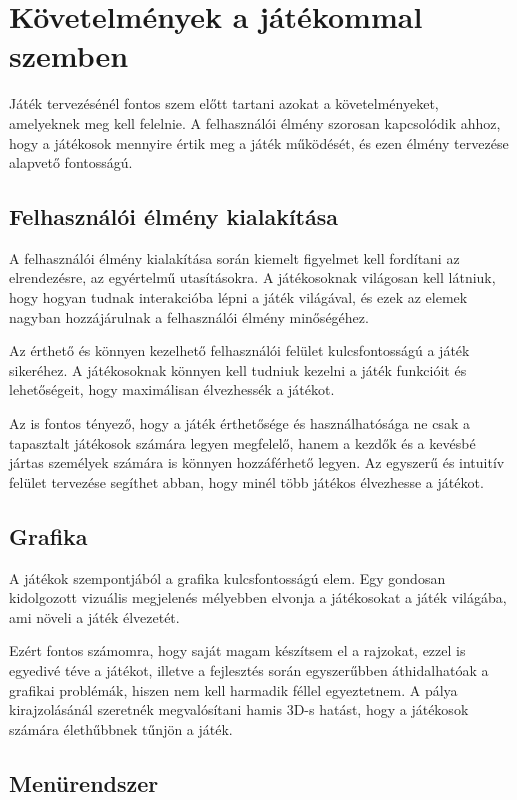 \chapter{Követelmények a játékommal szemben}
\indent \indent Játék tervezésénél fontos szem előtt tartani azokat a követelményeket, amelyeknek meg kell felelnie. A felhasználói élmény szorosan kapcsolódik ahhoz, hogy a játékosok mennyire értik meg a játék működését, és ezen élmény tervezése alapvető fontosságú.


\section{Felhasználói élmény kialakítása}

\indent \indent A felhasználói élmény kialakítása során kiemelt figyelmet kell fordítani az elrendezésre, az egyértelmű utasításokra. A játékosoknak világosan kell látniuk, hogy hogyan tudnak interakcióba lépni a játék világával, és ezek az elemek nagyban hozzájárulnak a felhasználói élmény minőségéhez.

Az érthető és könnyen kezelhető felhasználói felület kulcsfontosságú a játék sikeréhez. A játékosoknak könnyen kell tudniuk kezelni a játék funkcióit és lehetőségeit, hogy maximálisan élvezhessék a játékot.

Az is fontos tényező, hogy a játék érthetősége és használhatósága ne csak a tapasztalt játékosok számára legyen megfelelő, hanem a kezdők és a kevésbé jártas személyek számára is könnyen hozzáférhető legyen. Az egyszerű és intuitív felület tervezése segíthet abban, hogy minél több játékos élvezhesse a játékot.


\section{Grafika}

\indent \indent A játékok szempontjából a grafika kulcsfontosságú elem. Egy gondosan kidolgozott vizuális megjelenés mélyebben elvonja a játékosokat a játék világába, ami növeli a játék élvezetét.

Ezért fontos számomra, hogy saját magam készítsem el a rajzokat, ezzel is egyedivé téve a játékot, illetve a fejlesztés során egyszerűbben áthidalhatóak a grafikai problémák, hiszen nem kell harmadik féllel egyeztetnem. A pálya kirajzolásánál szeretnék megvalósítani hamis 3D-s hatást, hogy a játékosok számára élethűbbnek tűnjön a játék. 


\section{Menürendszer}

